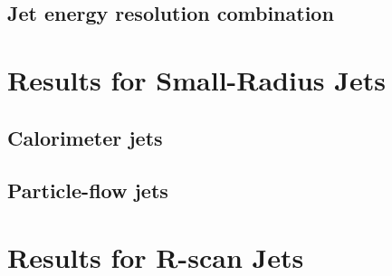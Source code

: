 \subsection{Jet energy resolution combination}
\section{Results for Small-Radius Jets}
\subsection{Calorimeter jets}
\subsection{Particle-flow jets}
\section{Results for R-scan Jets}
